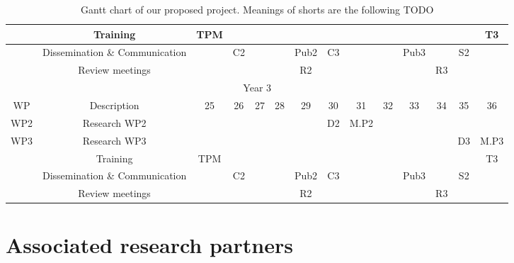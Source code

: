 \documentclass[a4paper,11pt]{scrartcl}
\begin{document}
\begin{table}[h!]
\begin{tabular}{|c|c|c|c|c|c|c|c|c|c|c|c|c|c|}
    \hline
     & Training & \cellcolor{gray!25} TPM  & \cellcolor{yellow!50} & \cellcolor{yellow!50} & \cellcolor{yellow!50} & \cellcolor{yellow!50} & \cellcolor{yellow!50} &  \cellcolor{yellow!50} & \cellcolor{yellow!50} & \cellcolor{yellow!50} & \cellcolor{yellow!50}  & \cellcolor{yellow!50} & \cellcolor{yellow!50} T3 \\
    \hline
     & Dissemination \& Communication & & \cellcolor{gray!25} C2 & & & \cellcolor{gray!25} Pub2 & \cellcolor{gray!25} C3 & &  & \cellcolor{gray!25} Pub3 & &  \cellcolor{gray!25} S2 &\\
    \hline
     & Review meetings & & & & & \cellcolor{green!25} R2  & & & & &\cellcolor{orange!50} R3 & &\\
     \hline  
     \multicolumn{14}{|c|}{\cellcolor{gray!50}Year 3} \\
    \hline
    WP & Description & 25 & 26 & 27 & 28 & 29 & 30 & 31 & 32 & 33 & 34 & 35 & 36\\
    \hline
    WP2 & Research WP2 & \cellcolor{green!25} & \cellcolor{green!25} & \cellcolor{green!25} & \cellcolor{green!25} & \cellcolor{green!25} & \cellcolor{green!25} D2 & \cellcolor{green!50} M.P2 & & & & &\\
    \hline
    WP3 & Research WP3 & & & & & &\cellcolor{orange!50} & \cellcolor{orange!50} & \cellcolor{orange!50} & \cellcolor{orange!50}& \cellcolor{orange!50}& \cellcolor{orange!50} D3 & \cellcolor{orange!75} M.P3\\
    \hline
     & Training & \cellcolor{gray!25} TPM  & \cellcolor{yellow!50} & \cellcolor{yellow!50} & \cellcolor{yellow!50} & \cellcolor{yellow!50} & \cellcolor{yellow!50} &  \cellcolor{yellow!50} & \cellcolor{yellow!50} & \cellcolor{yellow!50} & \cellcolor{yellow!50}  & \cellcolor{yellow!50} & \cellcolor{yellow!50} T3 \\
    \hline
     & Dissemination \& Communication & & \cellcolor{gray!25} C2 & & & \cellcolor{gray!25} Pub2 & \cellcolor{gray!25} C3 & &  & \cellcolor{gray!25} Pub3 & &  \cellcolor{gray!25} S2 &\\
    \hline
     & Review meetings & & & & & \cellcolor{green!25} R2  & & & & &\cellcolor{orange!50} R3 & &\\
     \hline  
    \end{tabular}
\caption{Gantt chart of our proposed project. Meanings of shorts are the following TODO}    
\label{tab:Gantt}
\end{table}


\section{Associated research partners}\label{sec:partners}
\end{document}
